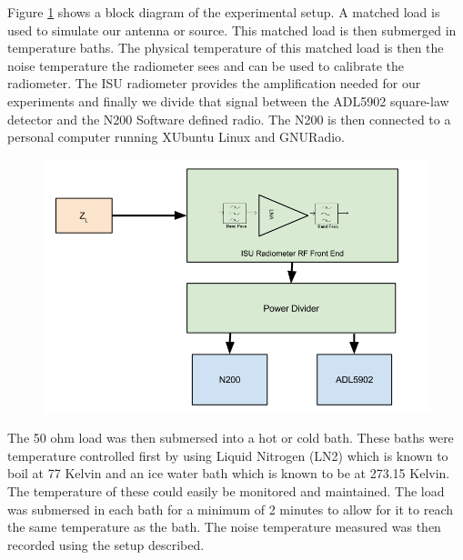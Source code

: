 Figure \ref{Exp1_Block} shows a block diagram of the experimental setup.  A matched load is used to simulate our antenna or source.  This matched load is then submerged in temperature baths.  The physical temperature of this matched load is then the noise temperature the radiometer sees and can be used to calibrate the radiometer.  The ISU radiometer provides the amplification needed for our experiments and finally we divide that signal between the ADL5902 square-law detector and the N200 Software defined radio.  The N200 is then connected to a personal computer running XUbuntu Linux and GNURadio.

{\begin{figure}[h!tb] \centering
\includegraphics[width=\textwidth]{Images/Exp_1_Setup.png}
\label{Exp1_Block}
\end{figure}
}

The 50 ohm load was then submersed into a hot or cold bath.  These baths were temperature controlled first by using Liquid Nitrogen (LN2) which is known to boil at 77 Kelvin and an ice water bath which is known to be at 273.15 Kelvin.  The temperature of these could easily be monitored and maintained.  The load was submersed in each bath for a minimum of 2 minutes to allow for it to reach the same temperature as the bath.  The noise temperature measured was then recorded using the setup described.


